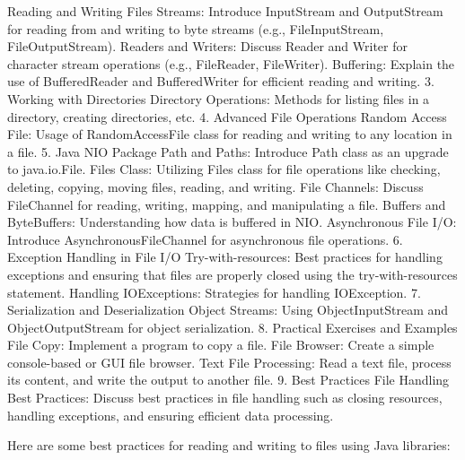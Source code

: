 Reading and Writing Files
Streams: Introduce InputStream and OutputStream for reading from and writing to byte streams (e.g., FileInputStream, FileOutputStream).
Readers and Writers: Discuss Reader and Writer for character stream operations (e.g., FileReader, FileWriter).
Buffering: Explain the use of BufferedReader and BufferedWriter for efficient reading and writing.
3. Working with Directories
Directory Operations: Methods for listing files in a directory, creating directories, etc.
4. Advanced File Operations
Random Access File: Usage of RandomAccessFile class for reading and writing to any location in a file.
5. Java NIO Package
Path and Paths: Introduce Path class as an upgrade to java.io.File.
Files Class: Utilizing Files class for file operations like checking, deleting, copying, moving files, reading, and writing.
File Channels: Discuss FileChannel for reading, writing, mapping, and manipulating a file.
Buffers and ByteBuffers: Understanding how data is buffered in NIO.
Asynchronous File I/O: Introduce AsynchronousFileChannel for asynchronous file operations.
6. Exception Handling in File I/O
Try-with-resources: Best practices for handling exceptions and ensuring that files are properly closed using the try-with-resources statement.
Handling IOExceptions: Strategies for handling IOException.
7. Serialization and Deserialization
Object Streams: Using ObjectInputStream and ObjectOutputStream for object serialization.
8. Practical Exercises and Examples
File Copy: Implement a program to copy a file.
File Browser: Create a simple console-based or GUI file browser.
Text File Processing: Read a text file, process its content, and write the output to another file.
9. Best Practices
File Handling Best Practices: Discuss best practices in file handling such as closing resources, handling exceptions, and ensuring efficient data processing.


Here are some best practices for reading and writing to files using Java libraries:


